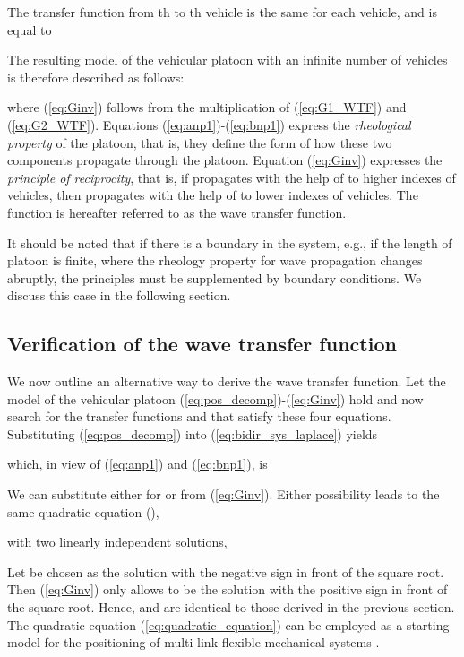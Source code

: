 \documentclass[final,5p,times,twocolumn]{elsarticle}
\begin{document}
The transfer function from th to th vehicle is the same for each vehicle, and is equal to


The resulting model of the vehicular platoon with an infinite number of vehicles is therefore described as follows:

where (\ref{eq:Ginv}) follows from the multiplication of (\ref{eq:G1_WTF}) and (\ref{eq:G2_WTF}). Equations (\ref{eq:anp1})-(\ref{eq:bnp1}) express the \emph{rheological property} of the platoon, that is, they define the form of how these two components propagate through the platoon. Equation (\ref{eq:Ginv}) expresses the \emph{principle of reciprocity}, that is, if  propagates with the help of  to higher indexes of vehicles, then  propagates with the help of  to lower indexes of vehicles. The function  is hereafter referred to as the wave transfer function.

It should be noted that if there is a boundary in the system, e.g., if the length of platoon is finite, where the rheology property for wave propagation changes abruptly, the principles must be supplemented by boundary conditions. We discuss this case in the following section.


\subsection{Verification of the wave transfer function}
We now outline an alternative way to derive the wave transfer function. Let the model of the vehicular platoon (\ref{eq:pos_decomp})-(\ref{eq:Ginv}) hold and now search for the transfer functions  and  that satisfy these four equations. Substituting (\ref{eq:pos_decomp}) into (\ref{eq:bidir_sys_laplace}) yields

which, in view of (\ref{eq:anp1}) and (\ref{eq:bnp1}), is

We can substitute either for  or  from (\ref{eq:Ginv}). Either possibility leads to the same quadratic equation (),

with two linearly independent solutions,

Let  be chosen as the solution with the negative sign in front of the square root. Then (\ref{eq:Ginv}) only allows  to be the solution with the positive sign in front of the square root. Hence,  and  are identical to those derived in the previous section. The quadratic equation (\ref{eq:quadratic_equation}) can be employed as a starting model for the positioning of multi-link flexible mechanical systems \cite{OConnor2006}.
\end{document}
